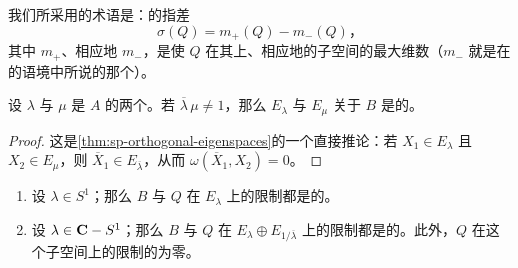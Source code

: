 我们所采用的术语是：\trQuadraticForm{}的\emph{\trSignature}指差
\[
\sigma(Q)=m_+(Q)-m_-(Q)\text{，}
\]
其中 $m_+$、相应地 $m_-$，是使 $Q$ 在其上\trPositiveDefinite{}、相应地\trNegativeDefinite{}的子空间的最大维数（$m_-$ 就是在\trCriticalPoint{}的语境中所说的那个\trIndex）。

\begin{lemma}\label{thm:b-orthogonal-eigenspaces}
设 $\lambda$ 与 $\mu$ 是 $A$ 的两个\trEigenvalue。若 $\overline{\lambda}\,\mu\neq1$，那么\trGeneralizedEigenspace{} $E_\lambda$ 与 $E_\mu$ 关于 $B$ 是\trOrthogonal{}的。
\end{lemma}

\begin{proof}
这是\cref{thm:sp-orthogonal-eigenspaces}的一个直接推论：若 $X_1\in E_\lambda$ 且 $X_2\in E_\mu$，则 $\overline{X}_1\in E_{\overline{\lambda}}$，从而 $\omega(\overline{X}_1,X_2)=0$。
\end{proof}

\begin{corollary}\label{thm:restriction-signature-zero}
\begin{enumerate}[label=(\arabic*)]
\item 设 $\lambda\in S^1$；那么 $B$ 与 $Q$ 在 $E_\lambda$ 上的限制都是\trNondegenerate{}的。
\item 设 $\lambda\in\mathbf{C}-S^1$；那么 $B$ 与 $Q$ 在 $E_\lambda\oplus E_{1/\overline{\lambda}}$ 上的限制都是\trNondegenerate{}的。此外，$Q$ 在这个子空间上的限制的\trSignature{}为零。
\end{enumerate}
\end{corollary}

